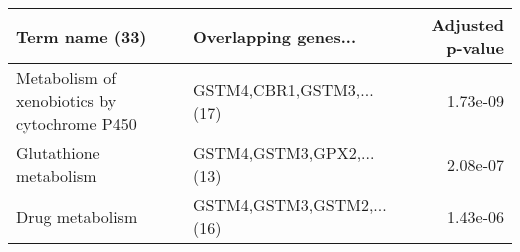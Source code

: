\begin{tabular}{llr}
\toprule
                              Term name (33) &      Overlapping genes... &  Adjusted p-value \\
\midrule
Metabolism of xenobiotics by cytochrome P450 &  GSTM4,CBR1,GSTM3,...(17) &          1.73e-09 \\
                      Glutathione metabolism &  GSTM4,GSTM3,GPX2,...(13) &          2.08e-07 \\
                             Drug metabolism & GSTM4,GSTM3,GSTM2,...(16) &          1.43e-06 \\
\bottomrule
\end{tabular}
